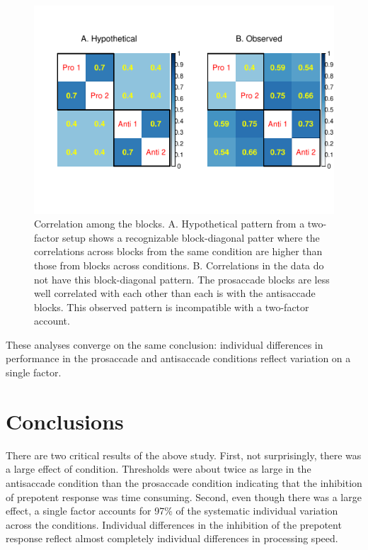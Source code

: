 \documentclass[
  ,man,floatsintext]{apa6}
\begin{document}
\begin{figure}
\centering
\includegraphics{p_files/figure-latex/heywood-1.pdf}
\caption{\label{fig:heywood}Correlation among the blocks. A. Hypothetical pattern from a two-factor setup shows a recognizable block-diagonal patter where the correlations across blocks from the same condition are higher than those from blocks across conditions. B. Correlations in the data do not have this block-diagonal pattern. The prosaccade blocks are less well correlated with each other than each is with the antisaccade blocks. This observed pattern is incompatible with a two-factor account.}
\end{figure}

These analyses converge on the same conclusion: individual differences in performance in the prosaccade and antisaccade conditions reflect variation on a single factor.

\hypertarget{conclusions}{%
\section{Conclusions}\label{conclusions}}

There are two critical results of the above study. First, not surprisingly, there was a large effect of condition. Thresholds were about twice as large in the antisaccade condition than the prosaccade condition indicating that the inhibition of prepotent response was time consuming. Second, even though there was a large effect, a single factor accounts for 97\% of the systematic individual variation across the conditions. Individual differences in the inhibition of the prepotent response reflect almost completely individual differences in processing speed.
\end{document}
